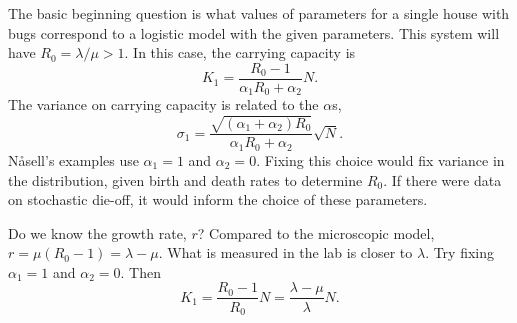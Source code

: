 \documentclass{article}
\begin{document}
The basic beginning question is what values of parameters for
a single house with bugs correspond to a logistic model with the given
parameters. This system will have $R_0=\lambda/\mu>1$. In this
case, the carrying capacity is
\begin{equation}
  K_1=\frac{R_0-1}{\alpha_1 R_0+\alpha_2}N.
\end{equation}
The variance on carrying capacity is related to the $\alpha$s,
\begin{equation}
  \sigma_1=\frac{\sqrt{(\alpha_1+\alpha_2)R_0}}{\alpha_1R_0+\alpha_2}\sqrt{N}.
\end{equation}
N{\aa}sell's examples use $\alpha_1=1$ and $\alpha_2=0$. 
Fixing this choice would fix variance in the distribution, given birth
and death rates to determine $R_0$. If there were data on stochastic die-off,
it would inform the choice of these parameters.

Do we know the growth rate, $r$? Compared to the microscopic model,
$r=\mu(R_0-1)=\lambda-\mu$. What is measured in the lab is closer to $\lambda$.
Try fixing $\alpha_1=1$ and $\alpha_2=0$. Then
\begin{equation}
  K_1=\frac{R_0-1}{R_0}N=\frac{\lambda-\mu}{\lambda}N.
\end{equation}



\end{document}
